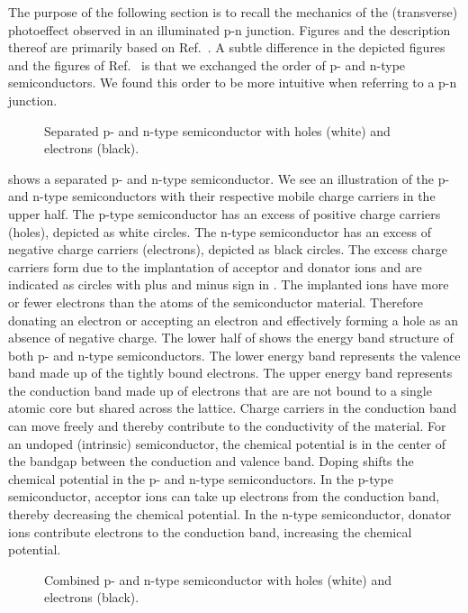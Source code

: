 The purpose of the following section is to recall the mechanics of the (transverse) photoeffect observed in an illuminated p-n junction.
Figures and the description thereof are primarily based on Ref.~\cite{Simon13}.
A subtle difference in the depicted figures and the figures of Ref.~\cite{Simon13} is that we exchanged the order of p- and n-type semiconductors.
We found this order to be more intuitive when referring to a p-n junction.
\begin{figure}[H]
	\centering
	
	\caption{Separated p- and n-type semiconductor with holes (white) and electrons (black).}\label{fig:pn_junction_separated}
\end{figure}
 shows a separated p- and n-type semiconductor.
We see an illustration of the p- and n-type semiconductors with their respective mobile charge carriers in the upper half.
The p-type semiconductor has an excess of positive charge carriers (holes), depicted as white circles.
The n-type semiconductor has an excess of negative charge carriers (electrons), depicted as black circles.
The excess charge carriers form due to the implantation of acceptor and donator ions and are indicated as circles with plus and minus sign in .
The implanted ions have more or fewer electrons than the atoms of the semiconductor material.
Therefore donating an electron or accepting an electron and effectively forming a hole as an absence of negative charge.
The lower half of  shows the energy band structure of both p- and n-type semiconductors.
The lower energy band represents the valence band made up of the tightly bound electrons.
The upper energy band represents the conduction band made up of electrons that are are not bound to a single atomic core but shared across the lattice.
Charge carriers in the conduction band can move freely and thereby contribute to the conductivity of the material.
For an undoped (intrinsic) semiconductor, the chemical potential is in the center of the bandgap between the conduction and valence band.
Doping shifts the chemical potential in the p- and n-type semiconductors.
In the p-type semiconductor, acceptor ions can take up electrons from the conduction band, thereby decreasing the chemical potential.
In the n-type semiconductor, donator ions contribute electrons to the conduction band, increasing the chemical potential.
\begin{figure}[H]
	\centering
	
	\caption{Combined p- and n-type semiconductor with holes (white) and electrons (black).}\label{fig:pn_junction_combined}
\end{figure}
